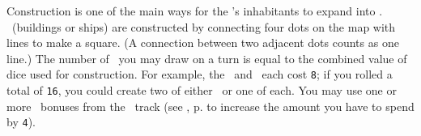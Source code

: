 Construction is one of the main ways for the \planet's inhabitants to expand into \outerspace.  \fortifications\ (buildings or ships) are constructed by connecting four dots on the map with lines to make a square. (A connection between two adjacent dots counts as one line.)
\newline\newline
The number of \fortifications\ you may draw on a turn is equal to the combined value of dice used for construction.  For example, the \academy\ and \factory\ each cost \texttt{8}; if you rolled a total of \texttt{16}, you could create two of either \fortifications\ or one of each.  You may use one or more \greatperson\ bonuses from the \population\ track (see , p.\pageref{sec:population} to increase the amount you have to spend by \texttt{4}).
